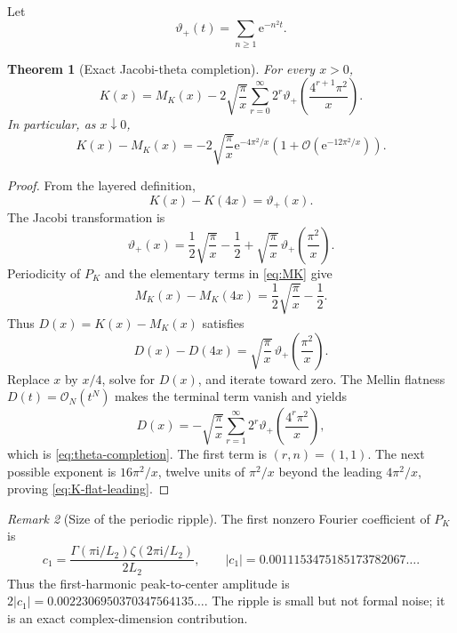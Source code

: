 \documentclass[11pt,oneside]{article}
\newtheorem{theorem}{Theorem}[section]
\theoremstyle{definition}
\theoremstyle{remark}
\newtheorem{remark}[theorem]{Remark}
\newcommand{\e}{\mathrm e}
\newcommand{\ii}{\mathrm i}
\newcommand{\bigO}{\mathcal O}
\begin{document}
Let
\begin{equation}\label{eq:theta-plus}
 \vartheta_+(t)=\sum_{n\ge1}\e^{-n^2t}.
\end{equation}

\begin{theorem}[Exact Jacobi-theta completion]\label{thm:theta-completion}
For every $x>0$,
\begin{equation}\label{eq:theta-completion}
 \boxed{
 K(x)=M_K(x)-2\sqrt{\frac\pi x}
 \sum_{r=0}^{\infty}2^r
 \vartheta_+\!\left(\frac{4^{r+1}\pi^2}{x}\right).}
\end{equation}
In particular, as $x\downarrow0$,
\begin{equation}\label{eq:K-flat-leading}
 \boxed{
 K(x)-M_K(x)=
 -2\sqrt{\frac\pi x}\e^{-4\pi^2/x}
 \left(1+\bigO(\e^{-12\pi^2/x})\right).}
\end{equation}
\end{theorem}

\begin{proof}
From the layered definition,
\begin{equation}\label{eq:K-difference}
 K(x)-K(4x)=\vartheta_+(x).
\end{equation}
The Jacobi transformation is
\begin{equation}\label{eq:Jacobi-plus}
 \vartheta_+(x)=\frac12\sqrt{\frac\pi x}-\frac12
 +\sqrt{\frac\pi x}\,\vartheta_+\!\left(\frac{\pi^2}{x}\right).
\end{equation}
Periodicity of $P_K$ and the elementary terms in \cref{eq:MK} give
\begin{equation}\label{eq:MK-difference}
 M_K(x)-M_K(4x)=\frac12\sqrt{\frac\pi x}-\frac12.
\end{equation}
Thus $D(x)=K(x)-M_K(x)$ satisfies
\begin{equation}\label{eq:D-difference}
 D(x)-D(4x)=\sqrt{\frac\pi x}\,
 \vartheta_+\!\left(\frac{\pi^2}{x}\right).
\end{equation}
Replace $x$ by $x/4$, solve for $D(x)$, and iterate toward zero.  The Mellin
flatness $D(t)=\bigO_N(t^N)$ makes the terminal term vanish and yields
\[
 D(x)=-\sqrt{\frac\pi x}
 \sum_{r=1}^{\infty}2^r
 \vartheta_+\!\left(\frac{4^r\pi^2}{x}\right),
\]
which is \cref{eq:theta-completion}.  The first term is $(r,n)=(1,1)$.
The next possible exponent is $16\pi^2/x$, twelve units of $\pi^2/x$ beyond
the leading $4\pi^2/x$, proving \cref{eq:K-flat-leading}.
\end{proof}

\begin{remark}[Size of the periodic ripple]
The first nonzero Fourier coefficient of $P_K$ is
\[
 c_1=\frac{\Gamma(\pi\ii/L_2)\zeta(2\pi\ii/L_2)}{2L_2},
 \qquad |c_1|=0.0011153475185173782067\ldots.
\]
Thus the first-harmonic peak-to-center amplitude is
$2|c_1|=0.0022306950370347564135\ldots$.  The ripple is small but not
formal noise; it is an exact complex-dimension contribution.
\end{remark}
\end{document}
